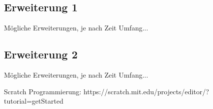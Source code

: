 \documentclass[conference]{IEEEtran}
\begin{document}
\subsection{Erweiterung 1}
Mögliche Erweiterungen, je nach Zeit Umfang...

\subsection{Erweiterung 2}
Mögliche Erweiterungen, je nach Zeit Umfang...

\begin{thebibliography}{00}
	 Scratch Programmierung: https://scratch.mit.edu/projects/editor/?tutorial=getStarted
\end{thebibliography}
\vspace{12pt}
\end{document}
